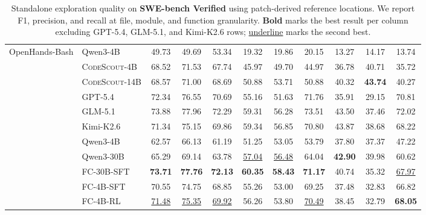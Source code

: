 \documentclass{llmxive}
\providecommand{\approach}{~}
\providecommand{\ourscell}[1]{\cellcolor{colorours}#1}
\providecommand{\oursgray}[1]{#1}
\begin{document}
\begin{table}[t]
{\begin{tabular}{ll ccc ccc ccc}
\midrule
\multirow{3}{*}{OpenHands-Bash}
 & Qwen3-4B                      & 49.73 & 49.69 & 53.34 & 19.32 & 19.86 & 20.15 & 13.27 & 14.17 & 13.74 \\
 & \textsc{CodeScout}-4B         & 68.52 & 71.53 & 67.74 & 45.97 & 49.70 & 44.97 & 36.78 & 40.71 & 35.72 \\
 & \textsc{CodeScout}-14B        & 68.57 & 71.00 & 68.69 & 50.88 & 53.71 & 50.88 & 40.32 & \textbf{43.74} & 40.27 \\
\midrule
\multirow{8}{*}{\approach}
 & \oursgray{GPT-5.4}            & \oursgray{72.34} & \oursgray{76.55} & \oursgray{70.69} & \oursgray{55.16} & \oursgray{51.63} & \oursgray{71.76} & \oursgray{35.91} & \oursgray{29.15} & \oursgray{70.81} \\
 & \oursgray{GLM-5.1}            & \oursgray{73.88} & \oursgray{77.96} & \oursgray{72.29} & \oursgray{59.31} & \oursgray{56.28} & \oursgray{73.51} & \oursgray{43.50} & \oursgray{37.46} & \oursgray{72.02} \\
 & \oursgray{Kimi-K2.6}          & \oursgray{71.34} & \oursgray{75.15} & \oursgray{69.86} & \oursgray{59.34} & \oursgray{56.85} & \oursgray{70.80} & \oursgray{43.87} & \oursgray{38.68} & \oursgray{68.22} \\
 & Qwen3-4B                      & 62.57 & 66.13 & 61.19 & 51.25 & 53.05 & 53.79 & 37.80 & 37.37 & 47.22 \\
 & Qwen3-30B                     & 65.29 & 69.14 & 63.78 & \underline{57.04} & \underline{56.48} & 64.04 & \textbf{42.90} & 39.98 & 60.62 \\
 & \ourscell{FC-30B-SFT}            & \ourscell{\textbf{73.71}} & \ourscell{\textbf{77.76}} & \ourscell{\textbf{72.13}} & \ourscell{\textbf{60.35}} & \ourscell{\textbf{58.43}} & \ourscell{\textbf{71.17}} & \ourscell{40.74} & \ourscell{35.32} & \ourscell{\underline{67.97}} \\
 & \ourscell{FC-4B-SFT}             & \ourscell{70.55} & \ourscell{74.75} & \ourscell{68.85} & \ourscell{55.26} & \ourscell{53.00} & \ourscell{69.25} & \ourscell{37.48} & \ourscell{32.83} & \ourscell{66.82} \\
 & \ourscell{FC-4B-RL}              & \ourscell{\underline{71.48}} & \ourscell{\underline{75.35}} & \ourscell{\underline{69.92}} & \ourscell{56.26} & \ourscell{53.80} & \ourscell{\underline{70.49}} & \ourscell{38.45} & \ourscell{32.79} & \ourscell{\textbf{68.05}} \\
\bottomrule
\end{tabular}%
}
\vspace{-3mm}
\caption{Standalone exploration quality on \textbf{SWE-bench Verified} using patch-derived reference locations. We report F1, precision, and recall at file, module, and function granularity. \textbf{Bold} marks the best result per column excluding GPT-5.4, GLM-5.1, and Kimi-K2.6 rows; \underline{underline} marks the second best.}
\label{tab:explore_main}
\end{table}
\end{document}
